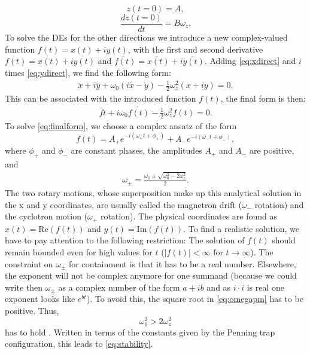 \begin{equation*}
    z(t=0) = A,
\end{equation*}
\begin{equation*}
    \frac{dz(t=0)}{dt} = B \omega_z.
\end{equation*}
To solve the DEs for the other directions we introduce a new complex-valued function $f(t) = x(t) + iy(t)$, with the first and second derivative $\dot{f(t)} = \dot{x(t)} + i\dot{y(t)}$ and $\ddot{f(t)} = \ddot{x(t)} + i\ddot{y(t)}$.
Adding \cref{eq:xdirect} and $i$ times \cref{eq:ydirect}, we find the following form:
\begin{align*} \ddot{x} + i\ddot{y} + \omega_0(i\dot{x} - \dot{y}) -\frac{1}{2}\omega_z^2 (x + iy) = 0. \end{align*}
This can be associated with the introduced function $f(t)$, the final form is then:
\begin{align}\label{eq:finalform} \ddot{f{t}} + i\omega_0 \dot{f(t)} - \frac{1}{2} \omega_z^2 f(t) = 0. \end{align}
To solve \cref{eq:finalform}, we choose a complex ansatz of the form
\begin{equation} \label{eq:Analyticalxy}
    f(t) = A_+ e^{-i(\omega_+ t + \phi_+)} + A_- e^{-i(\omega_- t + \phi_-)},  
\end{equation}
where $\phi_+$ and $\phi_-$ are constant phases, the amplitudes $A_+$ and $A_-$ are positive, and
\begin{align}\label{eq:omegapm}\omega_\pm = \frac{\omega_0 \pm \sqrt{\omega_0^2 - 2\omega_z^2}}{2}.\end{align}
The two rotary motions, whose superposition make up this analytical solution in the x and y coordinates, are usually called the magnetron drift ($\omega_-$ rotation) and the cyclotron motion ($\omega_+$ rotation)\cite{PenningTrapbook}.
The physical coordinates are found as $x(t) = \text{Re} (f(t))$ and $y(t) = \text{Im} (f(t))$.
To find a realistic solution, we have to pay attention to the following restriction: 
The solution of $f(t)$ should remain bounded even for high values for $t$ ($|f(t)| < \infty \text{ for } t \rightarrow \infty$).
The constraint on $\omega_{\pm}$ for containment is that it has to be a real number. Elsewhere, the exponent will not be complex anymore for one summand (because we could write then $\omega_{\pm}$ as a complex number of the form $a+ib$ and as $i \cdot i$ is real one exponent looks like $e^{bt}$). To avoid this, the square root in \cref{eq:omegapm} has to be positive. Thus, $$\omega_0^2 > 2\omega_z^2$$ has to hold \cite{PenningTrapbook}. Written in terms of the constants given by the Penning trap configuration, this leads to \cref{eq:stability}.
